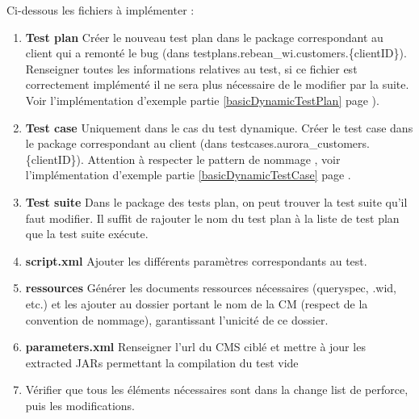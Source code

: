 Ci-dessous les fichiers \`{a} impl\'{e}menter :\\
\begin{enumerate}
	\item \textbf{Test plan} Cr\'{e}er le nouveau test plan dans le package correspondant au client qui a remont\'{e} le bug (dans testplans.rebean\_wi.customers.\{clientID\}). Renseigner toutes les informations relatives au test, si ce fichier est correctement impl\'{e}ment\'{e} il ne sera plus n\'{e}cessaire de le modifier par la suite. Voir l'implémentation d'exemple partie \ref{basicDynamicTestPlan} page \pageref{basicDynamicTestPlan}).
	\item \textbf{Test case} Uniquement dans le cas du test dynamique. Cr\'{e}er le test case dans le package correspondant au client (dans testcases.aurora\_customers.\{clientID\}). Attention \`{a} respecter le pattern de nommage , voir l'implémentation d'exemple partie \ref{basicDynamicTestCase} page \pageref{basicDynamicTestCase}.
	\item \textbf{Test suite} Dans le package des tests plan, on peut trouver la test suite qu'il faut modifier. Il suffit de rajouter le nom du test plan \`{a} la liste de test plan que la test suite ex\'{e}cute.
	\item \textbf{script.xml} Ajouter les diff\'{e}rents param\`{e}tres correspondants au test.
	\item \textbf{ressources} G\'{e}n\'{e}rer les documents ressources n\'{e}cessaires (queryspec, .wid, etc.) et les ajouter au dossier portant le nom de la CM (respect de la convention de nommage), garantissant l'unicité de ce dossier.
	\item \textbf{parameters.xml} Renseigner l'url du CMS cibl\'{e} et mettre \`{a} jour les extracted JARs permettant la compilation du test vide
	\item V\'{e}rifier que tous les éléments nécessaires sont dans la change list de perforce, puis  les modifications.
\end{enumerate}


